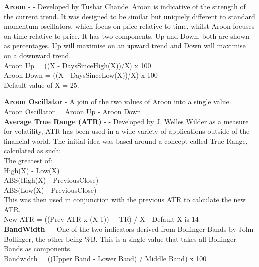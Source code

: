 \documentclass[12pt,a4paper]{article}
\begin{document}
\textbf{Aroon} - \cite{Chande1994} - Developed by Tushar Chande, Aroon is indicative of the strength of the current trend. It was designed to be similar but uniquely different to standard momentum oscillators, which focus on price relative to time, whilst Aroon focuses on time relative to price. It has two components, Up and Down, both are shown as percentages. Up will maximise on an upward trend and Down will maximise on a downward trend.\\

\noindent
Aroon Up = ((X - DaysSinceHigh(X))/X) x 100\\
Aroon Down = ((X - DaysSinceLow(X))/X) x 100\\
Default value of X = 25.

\iffalse
[]
\fi

\noindent
\textbf{Aroon Oscillator} - A join of the two values of Aroon into a single value.\\

\noindent
Aroon Oscillator = Aroon Up - Aroon Down\\

\iffalse
[]
\fi

\noindent
\textbf{Average True Range (ATR)} - \cite{Wilder1978} - Developed by J. Welles Wilder as a measure for volatility, ATR has been used in a wide variety of applications outside of the financial world. The initial idea was based around a concept called True Range, calculated as such:\\

\noindent
The greatest of:\\
High(X) - Low(X)\\
ABS(High(X) - PreviousClose)\\
ABS(Low(X) - PreviousClose)\\

\noindent
This was then used in conjunction with the previous ATR to calculate the new ATR.\\

\noindent
New ATR = ((Prev ATR x (X-1)) + TR) / X - Default X is 14 \\

\iffalse
[]
\fi

\noindent
\textbf{BandWidth} - \cite{Murphy1999} - One of the two indicators derived from Bollinger Bands by John Bollinger, the other being \%B. This is a single value that takes all Bollinger Bands as components.\\

\noindent
Bandwidth = ((Upper Band - Lower Band) / Middle Band) x 100 \\
\end{document}
